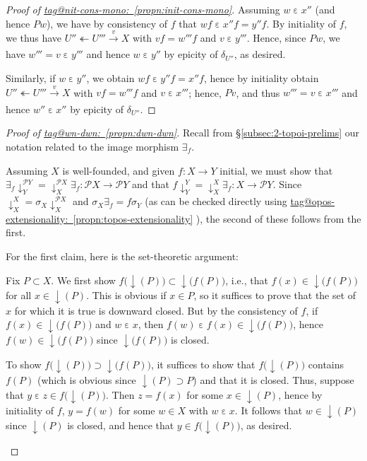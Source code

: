 \documentclass{amsart}
\makeatletter
\newcommand\dwnfn{{\downarrow}}
\newcommand\ein{\mathrel{\varepsilon}}
\newcommand\oot{\twoheadleftarrow}
\newcommand\pbig[1]{\big({#1}\big)}
\newcommand\pow{\mathcal{P}}
\newcommand\tox[2][]{\xrightarrow[#1]{#2}}
\newcommand\tagword[1]{\csname tag@#1\endcsname}
\def\label@tag#1:#2\@nil{#1}
\newcommand\labeltag[1]{\label@tag#1:\@nil}
\newcommand\jref[1]{%
  \texorpdfstring%
    {\hyperref[#1]{\tagword{\labeltag{#1}}~\ref*{#1}}}%
    {\tagword{\labeltag{#1}}~\ref*{#1}}%
}
\newcommand\prerefpost[3]{%
  \texorpdfstring%
    {\hyperref[#2]{#1\ref*{#2}#3}}%
    {#1\ref*{#2}#3}%
}
\newcommand\sref[1]{\prerefpost{\S}{#1}{}}
\theoremstyle{definition}
\theoremstyle{remark}
\theoremstyle{plainwithref}
\newenvironment{settybox}{\begin{tcolorbox}[colback=blue!20,breakable%
    ,enhanced%
    ,sharp corners%
    ,frame hidden%
    ,boxsep=0pt
    ,left=5pt,right=5pt,top=5pt,bottom=5pt
    ,enlarge left by=-5pt,width=\linewidth+10pt
    ,enlarge top by=5pt,enlarge bottom by=5pt
    ,before skip balanced=0pt,after skip balanced=0pt
    ]}{\end{tcolorbox}}
\makeatother
\begin{document}
\begin{proof}[Proof of \jref{propn:init-cons-mono}]
  Assuming \( w \ein x'' \) (and hence \( P w \)), we have by consistency of \( f \) that \( w f \ein x'' f = y'' f \).
  By initiality of \( f \), we thus have \( U'' \oot U''' \tox{v} X \) with \( v f = w''' f \) and \( v \ein y''' \).
  Hence, since \( P w \), we have \( w''' = v \ein y''' \) and hence \( w \ein y'' \) by epicity of \( \delta_{U''} \), as desired.

  Similarly, if \( w \ein y'' \), we obtain \( w f \ein y'' f = x'' f \), hence by initiality obtain \( U'' \oot U''' \tox{v} X \) with \( v f = w''' f \) and \( v \ein x''' \); hence, \( P v \), and thus \( w''' = v \ein x''' \) and hence \( w'' \ein x'' \) by epicity of \( \delta_{U''} \).
\end{proof}

\begin{proof}[Proof of \jref{propn:dwn-dwn}] \label{proof:dwn-dwn}
  Recall from \sref{subsec:2-topoi-prelims} our notation related to the image morphism \( \exists_f \).

  Assuming \( X \) is well-founded, and given \( f \colon X \to Y \) initial, we must show that \( \exists_f \dwnfn_Y^{\pow Y} = \dwnfn_X^{\pow X} \exists_f \colon \pow X \to \pow Y \) and that \( f \dwnfn_Y^Y = \dwnfn_X^X \exists_f \colon X \to \pow Y \).
  Since \( \dwnfn_X^X = \sigma_X \dwnfn_X^{\pow X} \) and \( \sigma_X \exists_f = f \sigma_Y \) (as can be checked directly using \jref{propn:topos-extensionality}), the second of these follows from the first.

  For the first claim, here is the set-theoretic argument:
  \begin{settybox}
    Fix \( P \subset X \).
    We first show \( f\pbig{\dwnfn(P)} \subset \dwnfn\pbig{f(P)} \), i.e., that \( f(x) \in \dwnfn\pbig{f(P)} \) for all \( x \in \dwnfn(P) \).
    This is obvious if \( x \in P \), so it suffices to prove that the set of \( x \) for which it is true is downward closed.
    But by the consistency of \( f \), if \( f(x) \in \dwnfn\pbig{f(P)} \) and \( w \ein x \), then \( f(w) \ein f(x) \in \dwnfn\pbig{f(P)} \), hence \( f(w) \in \dwnfn\pbig{f(P)} \) since \( \dwnfn\pbig{f(P)} \) is closed.

    To show \( f\pbig{\dwnfn(P)} \supset \dwnfn\pbig{f(P)} \), it suffices to show that \( f\pbig{\dwnfn(P)} \) contains \( f(P) \) (which is obvious since \( \dwnfn(P) \supset P \)) and that it is closed.
    Thus, suppose that \( y \ein z \in f\pbig{\dwnfn(P)} \).
    Then \( z = f(x) \) for some \( x \in \dwnfn(P) \), hence by initiality of \( f \), \( y = f(w) \) for some \( w \in X \) with \( w \ein x \).
    It follows that \( w \in \dwnfn(P) \) since \( \dwnfn(P) \) is closed, and hence that \( y \in f\pbig{\dwnfn(P)} \), as desired.
  \end{settybox}


\end{proof}
\end{document}
